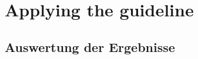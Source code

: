 \documentclass[11pt]{article}
\begin{document}
\section{Applying the guideline}

\subsection{Auswertung der Ergebnisse}
\end{document}
